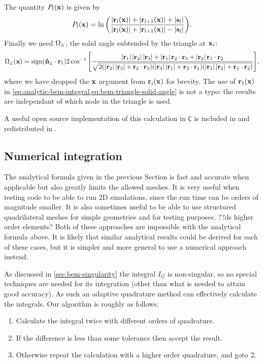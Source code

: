 The quantity $P_l(\mathbf{x})$ is given by
\begin{equation}
  P_l(\mathbf{x}) = \ln{\left( \frac{\left|{\mathbf{r}_l(\mathbf{x})} \right| + \left|{\mathbf{r}_{l+1}(\mathbf{x})} \right| + \left|{{\mathbf{s}}_l} \right|}
    {\left|{\mathbf{r}_l(\mathbf{x})} \right| + \left|{\mathbf{r}_{l+1}(\mathbf{x})} \right| - \left|{{\mathbf{s}}_l} \right|} \right)}.
\end{equation}
Finally we need $\Omega_\vartriangle$, the solid angle subtended by the triangle at $\mathbf{x}_i$:
\begin{equation}
  \label{eq:bem-triangle-solid-angle}
  \Omega_\vartriangle(\mathbf{x}) = \text{sign}(\mathbf{\hat{n}}_\vartriangle \cdot \mathbf{r}_1) 2 \cos^{-1}{\left[ \frac
    {\left|{\mathbf{r}_1} \right|\left|{\mathbf{r}_2} \right|\left|{\mathbf{r}_3} \right| + \left|{\mathbf{r}_1} \right| \mathbf{r}_2\cdot\mathbf{r}_3 + \left|{\mathbf{r}_2} \right|\mathbf{r}_1\cdot \mathbf{r}_2}
    {\sqrt{2(\left|{\mathbf{r}_2} \right|\left|{\mathbf{r}_3} \right| + \mathbf{r}_2\cdot\mathbf{r}_3)
        (\left|{\mathbf{r}_3} \right|\left|{\mathbf{r}_1} \right| + \mathbf{r}_3\cdot\mathbf{r}_1)
        (\left|{\mathbf{r}_1} \right|\left|{\mathbf{r}_2} \right| + \mathbf{r}_1\cdot\mathbf{r}_2)}} \right]},
\end{equation}
where we have dropped the $\mathbf{x}$ argument from $\mathbf{r}_i(\mathbf{x})$ for brevity.
The use of $\mathbf{r}_1(\mathbf{x})$ in \cref{eq:analytic-bem-integral,eq:bem-triangle-solid-angle} is not a typo: the results are independant of which node in the triangle is used.


A useful open source implementation of this calculation in \texttt{C} is included in \magpar \cite{magpar-website} and redistributed in \nmag \cite{nmag-website}.


\subsection{Numerical integration}

The analytical formula given in the previous Section is fast and accurate when applicable but also greatly limits the allowed meshes.
It is very useful when testing code to be able to run 2D simulations, since the run time can be orders of magnitude smaller.
It is also sometimes useful to be able to use structured quadrilateral meshes for simple geometries and for testing purposes.
??ds higher order elements?
Both of these approaches are impossible with the analytical formula above.
It is likely that similar analytical results could be derived for each of these cases, but it is simpler and more general to use a numerical approach instead.

As discussed in \cref{sec:bem-singularity} the integral $I_G$ is non-singular, so no special techniques are needed for its integration (other than what is needed to attain good accuracy).
As such an adaptive quadrature method can effectively calculate the integrals.
Our algorithm is roughly as follows:
\begin{enumerate}
\item Calculate the integral twice with different orders of quadrature.
\item If the difference is less than some tolerance then accept the result.
\item Otherwise repeat the calculation with a higher order quadrature, and goto 2.
\end{enumerate}

